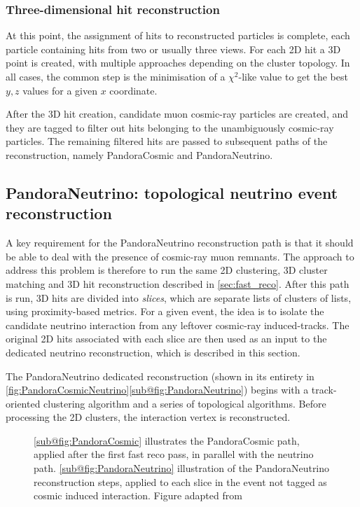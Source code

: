 \subsubsection{Three-dimensional hit reconstruction}

At this point, the assignment of hits to reconstructed particles is complete, each particle containing hits from two or usually three views. For each 2D hit a 3D point is created, with multiple approaches depending on the cluster topology. In all cases, the common step is the minimisation of a $\chi^2$-like value to get the best $y,z$ values for a given $x$ coordinate. 

After the 3D hit creation, candidate muon cosmic-ray particles are created, and they are tagged to filter out hits belonging to the unambiguously cosmic-ray particles. The remaining filtered hits are passed to subsequent paths of the reconstruction, namely PandoraCosmic and PandoraNeutrino. 

\subsection{PandoraNeutrino: topological neutrino event reconstruction} \label{sec:PandoraNeutrino}

A key requirement for the PandoraNeutrino reconstruction path is that it should be able to deal with the presence of cosmic-ray muon remnants. The approach to address this problem is therefore to run the same 2D clustering, 3D cluster matching and 3D hit reconstruction described in \autoref{sec:fast_reco}. After this path is run, 3D hits are divided into \emph{slices}, which are separate lists of clusters of lists, using proximity-based metrics. For a given event, the idea is to isolate the candidate neutrino interaction from any leftover cosmic-ray induced-tracks. The original 2D hits associated with each slice are then used as an input to the dedicated neutrino reconstruction, which is described in this section. 

The PandoraNeutrino dedicated reconstruction (shown in its entirety in \autoref{fig:PandoraCosmicNeutrino}\ref{sub@fig:PandoraNeutrino}) begins with a track-oriented clustering algorithm and a series of topological algorithms. Before processing the 2D clusters, the interaction vertex is reconstructed. 

\begin{figure}
    \centering
    \caption[PandoraCosmic and PandoraNeutrino paths illustration]{\ref{sub@fig:PandoraCosmic} illustrates the PandoraCosmic path, applied after the first fast reco pass, in parallel with the neutrino path. \ref{sub@fig:PandoraNeutrino} illustration of the PandoraNeutrino reconstruction steps, applied to each slice in the event not tagged as cosmic induced interaction. Figure adapted from \cite{MicroBooNE:2017xvs}}
    \label{fig:PandoraCosmicNeutrino}
\end{figure}

